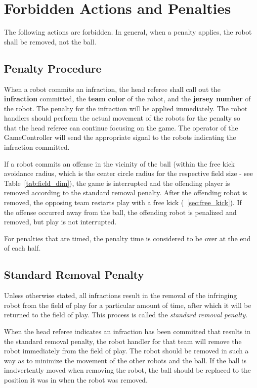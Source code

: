 \section{Forbidden Actions and Penalties}
\label{sec:forbidden_actions}

The following actions are forbidden. In general, when a penalty applies, the robot shall be removed, not the ball.

\subsection{Penalty Procedure}
\label{sec:penalty_procedure}

When a robot commits an infraction, the head referee shall call out the \textbf{infraction} committed, the \textbf{team color} of the robot, and the \textbf{jersey number} of the robot. The penalty for the infraction will be applied immediately. The robot handlers should perform the actual movement of the robots for the penalty so that the head referee can continue focusing on the game. The operator of the GameController will send the appropriate signal to the robots indicating the infraction committed.

If a robot commits an offense in the vicinity of the ball (within the free kick avoidance radius, which is the center circle radius for the respective field size - see Table~\ref{tab:field_dim}), the game is interrupted and the offending player is removed according to the standard removal penalty. After the offending robot is removed, the opposing team restarts play with a free kick (\cf~\cref{sec:free_kick}). If the offense occurred away from the ball, the offending robot is penalized and removed, but play is not interrupted.

For penalties that are timed, the penalty time is considered to be over at the end of each half.

\subsection{Standard Removal Penalty}
\label{sec:removal_penalty}

Unless otherwise stated, all infractions result in the removal of the infringing robot from the field of play for a particular amount of time, after which it will be returned to the field of play. This process is called the \textit{standard removal penalty}.

When the head referee indicates an infraction has been committed that results in the standard removal penalty, the robot handler for that team will remove the robot immediately from the field of play. The robot should be removed in such a way as to minimize the movement of the other robots and the ball. If the ball is inadvertently moved when removing the robot, the ball should be replaced to the position it was in when the robot was removed.

